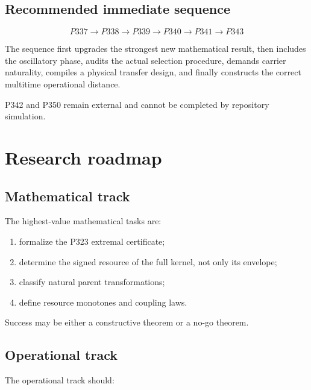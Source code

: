 \documentclass[11pt,a4paper,openany]{report}
\begin{document}
\section{Recommended immediate sequence}

\[
\boxed{
P337
\longrightarrow
P338
\longrightarrow
P339
\longrightarrow
P340
\longrightarrow
P341
\longrightarrow
P343
}
\]

The sequence first upgrades the strongest new mathematical result, then includes the oscillatory phase, audits the actual selection procedure, demands carrier naturality, compiles a physical transfer design, and finally constructs the correct multitime operational distance.

P342 and P350 remain external and cannot be completed by repository simulation.

\chapter{Research roadmap}

\section{Mathematical track}

The highest-value mathematical tasks are:

\begin{enumerate}
\item 
formalize the P323 extremal certificate;

\item 
determine the signed resource of the full kernel, not only its envelope;

\item 
classify natural parent transformations;

\item 
define resource monotones and coupling laws.

\end{enumerate}

Success may be either a constructive theorem or a no-go theorem.

\section{Operational track}

The operational track should:
\end{document}

